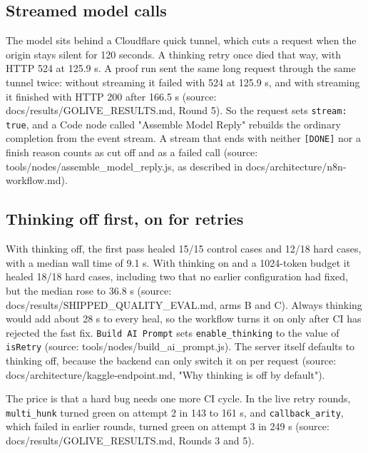 \subsection{Streamed model calls}

The model sits behind a Cloudflare quick tunnel, which cuts a request when the origin stays silent for 120 seconds. A thinking retry once died that way, with HTTP 524 at 125.9 s. A proof run sent the same long request through the same tunnel twice: without streaming it failed with 524 at 125.9 s, and with streaming it finished with HTTP 200 after 166.5 s (source: docs/\allowbreak{}results/\allowbreak{}GOLIVE\_\allowbreak{}RESULTS.md, Round 5). So the request sets \texttt{stream:\allowbreak{} true}, and a Code node called "Assemble Model Reply" rebuilds the ordinary completion from the event stream. A stream that ends with neither \texttt{[DONE]} nor a finish reason counts as cut off and as a failed call (source: tools/\allowbreak{}nodes/\allowbreak{}assemble\_\allowbreak{}model\_\allowbreak{}reply.js, as described in docs/\allowbreak{}architecture/\allowbreak{}n8n-workflow.md).

\subsection{Thinking off first, on for retries}

With thinking off, the first pass healed 15/\allowbreak{}15 control cases and 12/\allowbreak{}18 hard cases, with a median wall time of 9.1 s. With thinking on and a 1024-token budget it healed 18/\allowbreak{}18 hard cases, including two that no earlier configuration had fixed, but the median rose to 36.8 s (source: docs/\allowbreak{}results/\allowbreak{}SHIPPED\_\allowbreak{}QUALITY\_\allowbreak{}EVAL.md, arms B and C). Always thinking would add about 28 s to every heal, so the workflow turns it on only after CI has rejected the fast fix. \texttt{Build AI Prompt} sets \texttt{enable\_\allowbreak{}thinking} to the value of \texttt{isRetry} (source: tools/\allowbreak{}nodes/\allowbreak{}build\_\allowbreak{}ai\_\allowbreak{}prompt.js). The server itself defaults to thinking off, because the backend can only switch it on per request (source: docs/\allowbreak{}architecture/\allowbreak{}kaggle-endpoint.md, "Why thinking is off by default").

The price is that a hard bug needs one more CI cycle. In the live retry rounds, \texttt{multi\_\allowbreak{}hunk} turned green on attempt 2 in 143 to 161 s, and \texttt{callback\_\allowbreak{}arity}, which failed in earlier rounds, turned green on attempt 3 in 249 s (source: docs/\allowbreak{}results/\allowbreak{}GOLIVE\_\allowbreak{}RESULTS.md, Rounds 3 and 5).

